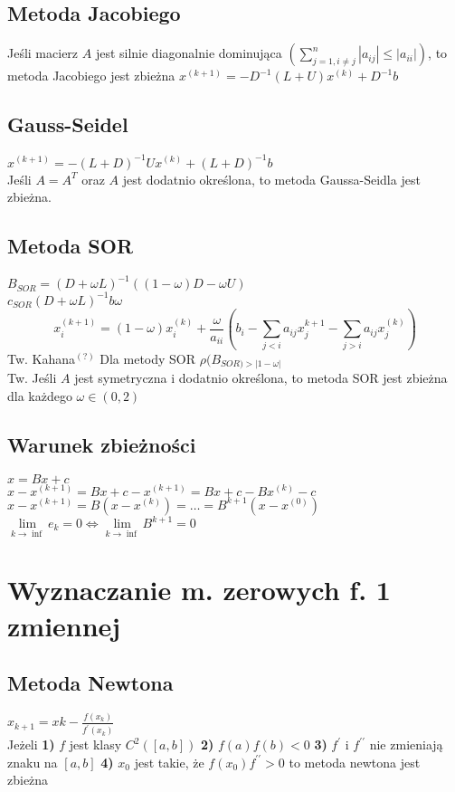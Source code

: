 \documentclass[twocolumn]{article}
\begin{document}
\begin{flushleft}
\subsection{Metoda Jacobiego}
Jeśli macierz $A$ jest silnie diagonalnie dominująca $\left(\sum_{j=1,i\neq j}^n |a_{ij}| \leq |a_{ii}|\right)$, to metoda Jacobiego jest zbieżna
$x^{(k+1)} = -D^{-1}(L+U)x^{(k)}+D^{-1}b$
\begin{algorithmic}
\ENDFOR
\end{algorithmic}
\subsection{Gauss-Seidel}
$x^{(k+1)} = -(L+D)^{-1}Ux^{(k)}+(L+D)^{-1}b$\\
Jeśli $A=A^T$ oraz $A$ jest dodatnio określona, to metoda Gaussa-Seidla jest zbieżna.
\subsection{Metoda SOR}
$B_{SOR} = (D + \omega L)^{-1}((1- \omega)D - \omega U)$\\
$c_{SOR}(D+\omega L)^{-1}b \omega$\\
$$x_i^{(k+1)} = (1 - \omega)x_i^{(k)} + \frac{\omega}{a_{ii}}\left( b_i- \sum_{j<i}a_{ij}x_j^{k+1} - \sum_{j>i}a_{ij}x_j^{(k)} \right)$$
Tw. Kahana$^{(?)}$ Dla metody SOR $\rho(B_{SOR)>|1-\omega|}$\\
Tw. Jeśli $A$ jest symetryczna i dodatnio określona, to metoda SOR jest zbieżna dla każdego $\omega \in (0,2)$
\subsection{Warunek zbieżności}
\thispagestyle{empty} %
$x = Bx + c$\\
$x - x^{(k+1)} = Bx + c - x^{(k+1)} = Bx+c -Bx^{(k)}-c$\\
$x-x^{(k+1)} = B(x-x^{(k)}) = \ldots = B^{k+1}(x-x^{(0)})$\\
$\underset{k \to \inf}{\lim} e_k = 0 \Leftrightarrow \underset{k \to \inf}{\lim} B^{k+1} = 0$
\section{Wyznaczanie m. zerowych f. 1 zmiennej}
\subsection{Metoda Newtona}
$x_{k+1}=x{k}-\frac{f(x_k)}{f^{\prime}(x_k)}$\\
Jeżeli \textbf{1)} $f$ jest klasy $C^2([a,b])$ \textbf{2)} $f(a)f(b)<0$  \textbf{3)} $f^{\prime}$ i $f^{\prime \prime}$ nie zmieniają znaku na $[a,b]$ \textbf{4)} $x_0$ jest takie, że $f(x_0)f^{\prime \prime} > 0$ to metoda newtona jest zbieżna\\

\end{flushleft}
\end{document}
